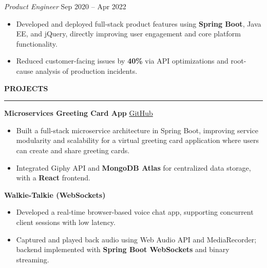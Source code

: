 \documentclass[10pt]{article}
\newcommand{\sectionTitle}[1]{\vspace{1pt}\noindent\textbf{\small #1}\vspace{0.5pt}\hrule\vspace{1pt}}
\begin{document}
\textit{Product Engineer} \hfill Sep 2020 -- Apr 2022
\begin{itemize}
    \item Developed and deployed full-stack product features using \textbf{Spring Boot}, Java EE, and jQuery, directly improving user engagement and core platform functionality.
    \item Reduced customer-facing issues by \textbf{40\%} via API optimizations and root-cause analysis of production incidents.
\end{itemize}

\sectionTitle{PROJECTS}


\textbf{Microservices Greeting Card App} \hfill \href{https://github.com/SuhasBk/vcard-microservices}{GitHub}
\begin{itemize}
    \item Built a full-stack microservice architecture in Spring Boot, improving service modularity and scalability for a virtual greeting card application where users can create and share greeting cards.
    \item Integrated Giphy API and \textbf{MongoDB Atlas} for centralized data storage, with a \textbf{React} frontend.
\end{itemize}

\textbf{Walkie-Talkie (WebSockets)}
\begin{itemize}
    \item Developed a real-time browser-based voice chat app, supporting concurrent client sessions with low latency.
    \item Captured and played back audio using Web Audio API and MediaRecorder; backend implemented with \textbf{Spring Boot WebSockets} and binary streaming.
\end{itemize}

\end{document}
